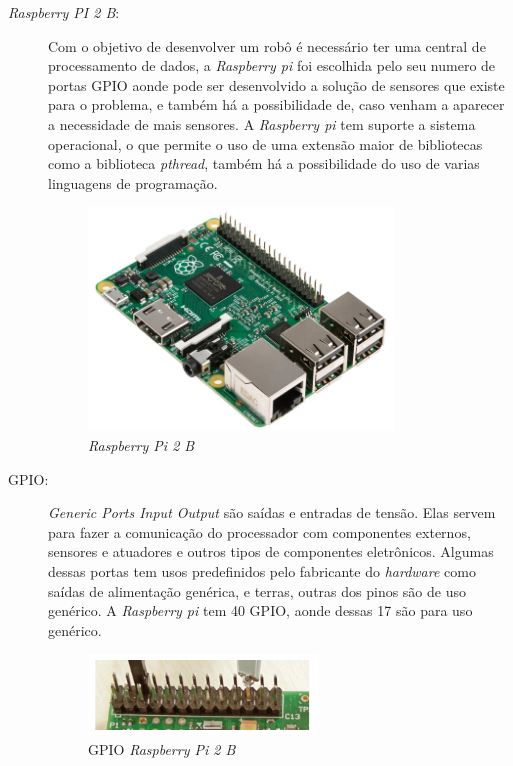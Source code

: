 \begin{description}
\item[\textit{Raspberry PI 2 B}:] Com o objetivo de desenvolver um robô é
necessário ter uma central de processamento de dados, a \textit{Raspberry pi} foi
escolhida pelo seu numero de portas GPIO aonde pode ser desenvolvido a solução
de sensores que existe para o problema, e também há a possibilidade de, caso
venham a aparecer a necessidade de mais sensores. A \textit{Raspberry pi} tem suporte a
sistema operacional, o que permite o uso de uma extensão maior de bibliotecas
como a biblioteca \textit{pthread}, também há a possibilidade do uso de varias linguagens
de programação.
\par
\begin{figure}[h]
  \centering
  \includegraphics[width=0.8\textwidth]{figures/rpi2b.jpg}
  \caption{\textit{Raspberry Pi 2 B}}
  \label{fig:raspberry2b}
\end{figure}
\FloatBarrier

\item[GPIO:] \textit{Generic Ports Input Output} são saídas e entradas de tensão.
Elas servem para fazer a comunicação do processador com componentes externos,
sensores e atuadores e outros tipos de componentes eletrônicos. Algumas dessas
portas tem usos predefinidos pelo fabricante do \textit{hardware} como saídas de
alimentação genérica, e terras, outras dos pinos são de uso genérico. A
\textit{Raspberry pi} tem 40 GPIO, aonde dessas 17 são para uso genérico.
\par
\begin{figure}[h]
  \centering
  \includegraphics[width=0.6\textwidth]{figures/gpio.png}
  \caption{GPIO \textit{Raspberry Pi 2 B}}
  \label{fig:raspberry2b}
\end{figure}
\FloatBarrier


\end{description}

